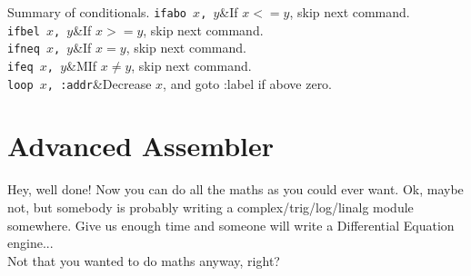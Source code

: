 \documentclass[a4paper,oneside,openany]{book}
\begin{document}
\begin{codetablefig}{Summary of conditionals.}
\texttt{ifabo $x$, $y$}&If $x <= y$, skip next command.\\
\texttt{ifbel $x$, $y$}&If $x >= y$, skip next command.\\
\texttt{ifneq $x$, $y$}&If $x = y$, skip next command.\\
\texttt{ifeq $x$, $y$}&MIf $x \neq y$, skip next command.\\
\texttt{loop $x$, :addr}&Decrease $x$, and goto :label if above zero.\\
\end{codetablefig}
\section{Advanced Assembler}
Hey, well done! Now you can do all the maths as you could ever want. Ok, maybe
not, but somebody is probably writing a complex/trig/log/linalg module somewhere.
Give us enough time and someone will write a Differential Equation engine...
\smallskip\\
Not that you wanted to do maths anyway, right?
\end{document}
